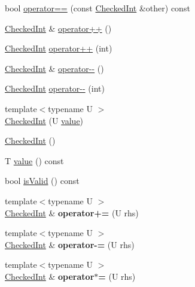\begin{DoxyCompactItemize}
\item 
bool \hyperlink{classmozilla_1_1_checked_int_aa3f459aecc1110200dab51b050bdf008}{operator==} (const \hyperlink{classmozilla_1_1_checked_int}{Checked\-Int} \&other) const 
\item 
\hyperlink{classmozilla_1_1_checked_int}{Checked\-Int} \& \hyperlink{classmozilla_1_1_checked_int_adacd246ebbc79a313cfdff357096d047}{operator++} ()
\item 
\hyperlink{classmozilla_1_1_checked_int}{Checked\-Int} \hyperlink{classmozilla_1_1_checked_int_a722019a310adedb97895149f627dc6bb}{operator++} (int)
\item 
\hyperlink{classmozilla_1_1_checked_int}{Checked\-Int} \& \hyperlink{classmozilla_1_1_checked_int_aba5cc6bf09a00fcc4749b6b66ff6b8d0}{operator-\/-\/} ()
\item 
\hyperlink{classmozilla_1_1_checked_int}{Checked\-Int} \hyperlink{classmozilla_1_1_checked_int_ab79d2ebe44bf3a6beb3234812213acfc}{operator-\/-\/} (int)
\item 
{\footnotesize template$<$typename U $>$ }\\\hyperlink{classmozilla_1_1_checked_int_a5ef492c2db102e1e909e9a0fa2c51e07}{Checked\-Int} (U \hyperlink{classmozilla_1_1_checked_int_a8b36b4a1c385abb43884bcb430fef088}{value})
\item 
\hyperlink{classmozilla_1_1_checked_int_a4335815f498c3974ee7c223b2c6ee653}{Checked\-Int} ()
\item 
T \hyperlink{classmozilla_1_1_checked_int_a8b36b4a1c385abb43884bcb430fef088}{value} () const 
\item 
bool \hyperlink{classmozilla_1_1_checked_int_aa875473e559646998e2cb4f0f54aedc3}{is\-Valid} () const 
\item 
\hypertarget{classmozilla_1_1_checked_int_a36f745b635b95b5b3bb222469b0ef634}{{\footnotesize template$<$typename U $>$ }\\\hyperlink{classmozilla_1_1_checked_int}{Checked\-Int} \& {\bfseries operator+=} (U rhs)}\label{classmozilla_1_1_checked_int_a36f745b635b95b5b3bb222469b0ef634}

\item 
\hypertarget{classmozilla_1_1_checked_int_a6f4c078a17615065226c979bc6e3fd3a}{{\footnotesize template$<$typename U $>$ }\\\hyperlink{classmozilla_1_1_checked_int}{Checked\-Int} \& {\bfseries operator-\/=} (U rhs)}\label{classmozilla_1_1_checked_int_a6f4c078a17615065226c979bc6e3fd3a}

\item 
\hypertarget{classmozilla_1_1_checked_int_a58b43b6cddc26978a9c25f41a1d61a3e}{{\footnotesize template$<$typename U $>$ }\\\hyperlink{classmozilla_1_1_checked_int}{Checked\-Int} \& {\bfseries operator$\ast$=} (U rhs)}\label{classmozilla_1_1_checked_int_a58b43b6cddc26978a9c25f41a1d61a3e}


\end{DoxyCompactItemize}
